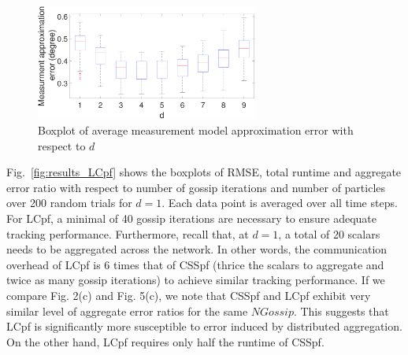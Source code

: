 \documentclass[10pt,letterpaper,final]{article}
\begin{document}
\begin{figure}
\centering
\includegraphics[width=0.65\textwidth]{Figures/boxplot_LCpf_mea_approx_error_maxDegree}
\caption{Boxplot of average measurement model approximation error with respect to $d$}
\label{fig:boxplot_LCpf_meas_approx_error}
\end{figure}

Fig.~\ref{fig:results_LCpf} shows the boxplots of RMSE, total runtime and aggregate error ratio with respect to number of gossip iterations and number of particles over 200 random trials for $d=1$. Each data point is averaged over all time steps. For LCpf, a minimal of 40 gossip iterations are necessary to ensure adequate tracking performance. Furthermore, recall that, at $d=1$, a total of 20 scalars needs to be aggregated across the network. In other words, the communication overhead of LCpf is 6 times that of CSSpf (thrice the scalars to aggregate and twice as many gossip iterations) to achieve similar tracking performance. If we compare Fig. 2(c) and Fig. 5(c), we note that CSSpf and LCpf exhibit very similar level of aggregate error ratios for the same $NGossip$. This suggests that LCpf is significantly more susceptible to error induced by distributed aggregation. On the other hand, LCpf requires only half the runtime of CSSpf. 
\end{document}
